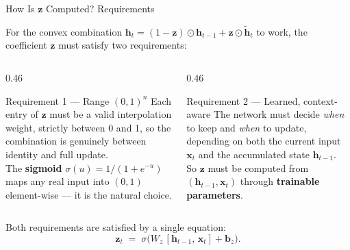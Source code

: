 \documentclass[aspectratio=169]{beamer}
\begin{document}
%
%
\begin{frame}{How Is $\boldsymbol{z}$ Computed? Requirements}

For the convex combination $\boldsymbol{h}_t = (1-\boldsymbol{z})\odot\boldsymbol{h}_{t-1}
+ \boldsymbol{z}\odot\tilde{\boldsymbol{h}}_t$ to work, the coefficient $\boldsymbol{z}$
must satisfy two requirements:

\begin{columns}[T]

  \begin{column}{0.46\textwidth}
    \begin{block}{Requirement 1 — Range $(0,1)^n$}
      Each entry of $\boldsymbol{z}$ must be a valid interpolation weight,
      strictly between 0 and 1, so the combination is genuinely
      between identity and full update.\\[6pt]
      The \textbf{sigmoid} $\sigma(u) = 1/(1+e^{-u})$ maps any real
      input into $(0,1)$ element-wise — it is the natural choice.
    \end{block}
  \end{column}

  \begin{column}{0.46\textwidth}
    \begin{block}{Requirement 2 — Learned, context-aware}
      The network must decide \emph{when} to keep and \emph{when}
      to update, depending on both the current input $\boldsymbol{x}_t$
      and the accumulated state $\boldsymbol{h}_{t-1}$.\\[6pt]
      So $\boldsymbol{z}$ must be computed from
      $(\boldsymbol{h}_{t-1}, \boldsymbol{x}_t)$ through
      \textbf{trainable parameters}.
    \end{block}
  \end{column}

\end{columns}

\medskip
Both requirements are satisfied by a single equation:
\[
  \boldsymbol{z}_t \;=\; \sigma\!\bigl(W_z\,[\boldsymbol{h}_{t-1},\, \boldsymbol{x}_t] + \boldsymbol{b}_z\bigr).
\]

\end{frame}
%
%
\end{document}
